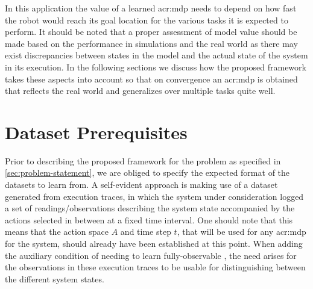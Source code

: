 In this application the value of a learned \acrshort{acr:mdp} needs to depend on how fast the robot would reach its goal location for the various tasks it is expected to perform.
It should be noted that a proper assessment of model value should be made based on the performance in simulations and the real world as there may exist discrepancies between states in the model and the actual state of the system in its execution.
In the following sections we discuss how the proposed framework takes these aspects into account so that on convergence an \acrshort{acr:mdp} is obtained that reflects the real world and generalizes over multiple tasks quite well. %


\section{Dataset Prerequisites}
\label{sec:dataset-prerequisites}

Prior to describing the proposed framework for the problem as specified in \autoref{sec:problem-statement}, we are obliged to specify the expected format of the datasets to learn  from.
A self-evident approach is making use of a dataset generated from execution traces, in which the system under consideration logged a set of readings/observations describing the system state accompanied by the actions selected in between at a fixed time interval.
One should note that this means that the action space $A$ and time step $t$, that will be used for any \acrshort{acr:mdp} for the system, should already have been established at this point.
When adding the auxiliary condition of needing to learn fully-observable , the need arises for the observations in these execution traces to be usable for distinguishing between the different system states.

